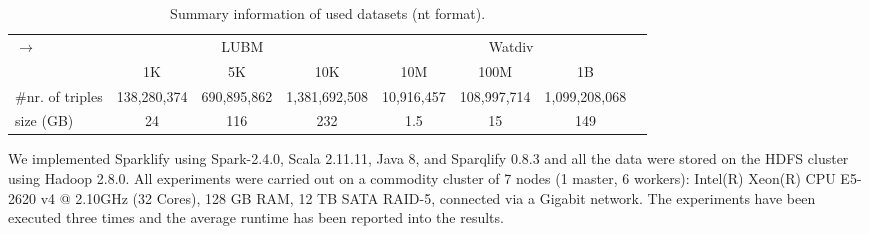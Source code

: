 
\begin{table}
\centering
\begin{tabularx}{\textwidth}{Xccccccc}	
\toprule
\multirow{2}{*}{$\longrightarrow$} & \multicolumn{3}{c|}{LUBM} & \multicolumn{4}{c}{Watdiv} \\
\cline{2-8}  \rule{0pt}{10pt}
&   \scriptsize{1K} & \scriptsize{5K} & \scriptsize{10K}  & \scriptsize{10M} &\scriptsize{100M} &\scriptsize{1B} &\\
\midrule
\scriptsize{\#nr. of triples}& \scriptsize{138,280,374} & \scriptsize{690,895,862} & \scriptsize{1,381,692,508} & \scriptsize{10,916,457} & \scriptsize{108,997,714} & \scriptsize{1,099,208,068} &  \\
\scriptsize{size (GB)}  & \scriptsize{24} & \scriptsize{116} & \scriptsize{232} & \scriptsize{1.5} &\scriptsize{15} &\scriptsize{149} &\\
\bottomrule
\end{tabularx}
{\caption{Summary information of used datasets (nt format).}\label{tab:dataset_info}}
\end{table}


We implemented Sparklify using Spark-2.4.0, Scala 2.11.11, Java 8, and Sparqlify 0.8.3 and all the data were stored on the HDFS cluster using Hadoop 2.8.0.
All experiments were carried out on a commodity cluster of 7 nodes (1 master, 6 workers): Intel(R) Xeon(R) CPU E5-2620 v4 @ 2.10GHz (32 Cores), 128 GB RAM, 12 TB SATA RAID-5, connected via a Gigabit network.
The experiments have been executed three times and the average runtime has been reported into the results.

